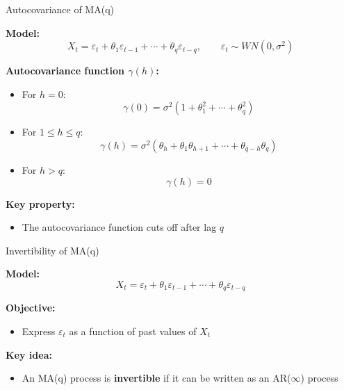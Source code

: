 \documentclass[aspectratio=169]{beamer}
\begin{document}
\begin{frame}{Autocovariance of MA(q)}

\textbf{Model:}
\[
X_t = \varepsilon_t + \theta_1 \varepsilon_{t-1} + \cdots + \theta_q \varepsilon_{t-q},
\qquad \varepsilon_t \sim WN(0,\sigma^2)
\]

\vspace{0.4cm}

\textbf{Autocovariance function $\gamma(h)$:}

\begin{itemize}
    \item For $h = 0$:
    \[
    \gamma(0) = \sigma^2 \left(1 + \theta_1^2 + \cdots + \theta_q^2 \right)
    \]
    
    \vspace{0.3cm}
    
    \item For $1 \leq h \leq q$:
    \[
    \gamma(h) = \sigma^2 \left( \theta_h + \theta_1 \theta_{h+1} + \cdots + \theta_{q-h} \theta_q \right)
    \]
    
    \vspace{0.3cm}
    
    \item For $h > q$:
    \[
    \gamma(h) = 0
    \]
\end{itemize}

\vspace{0.4cm}

\textbf{Key property:}
\begin{itemize}
    \item The autocovariance function cuts off after lag $q$
\end{itemize}

\end{frame}

\begin{frame}{Invertibility of MA(q)}

\textbf{Model:}
\[
X_t = \varepsilon_t + \theta_1 \varepsilon_{t-1} + \cdots + \theta_q \varepsilon_{t-q}
\]

\vspace{0.4cm}

\textbf{Objective:}
\begin{itemize}
    \item Express $\varepsilon_t$ as a function of past values of $X_t$
\end{itemize}

\vspace{0.4cm}

\textbf{Key idea:}
\begin{itemize}
    \item An MA(q) process is \textbf{invertible} if it can be written as an AR($\infty$) process
\end{itemize}

\end{frame}
\end{document}
